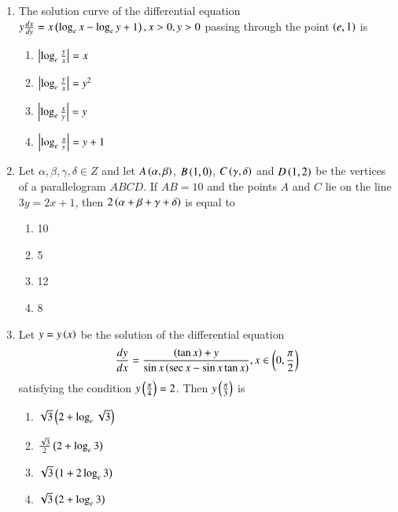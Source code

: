 \documentclass[journal]{IEEEtran}
\begin{document}
\begin{enumerate}
    \item The solution curve of the differential equation $y\frac{dx}{dy}
    = x\left(\log_e x - \log_e y + 1\right), x > 0, y > 0$ passing through the point
    $\left(e, 1\right)$ is

    \begin{multicols}{4}
\begin{enumerate}

        \item $\left\vert\log_e \frac{y}{x}\right\vert = x$
        \item $\left\vert\log_e \frac{y}{x}\right\vert = y^2$
        \item $\left\vert\log_e \frac{x}{y}\right\vert = y$
        \item $\left\vert\log_e \frac{x}{y}\right\vert = y + 1$
    \end{enumerate}
\end{multicols}

    \item Let $\alpha,\beta,\gamma,\delta \in Z$ and let $A\left(\alpha,\beta\right)$,
    $B\left(1, 0\right)$, $C\left(\gamma,\delta\right)$ and $D\left(1, 2\right)$ be the
    vertices of a parallelogram $ABCD$. If $AB = 10$ and the points
    $A$ and $C$ lie on the line $3y = 2x + 1$, then
    $2\left(\alpha + \beta + \gamma + \delta\right)$ is equal to

    \begin{multicols}{4}
\begin{enumerate}

        \item 10
        \item 5
        \item 12
        \item 8
    \end{enumerate}
\end{multicols}

    \item Let $y = y\left(x\right)$ be the solution of the differential equation
    \begin{align*}
    \frac{dy}{dx} = \frac{\left(\tan x\right) + y}{\sin x\left(\sec x - \sin x \tan x\right)},
    x \in \left(0, \frac{\pi}{2}\right)
    \end{align*}
    satisfying the condition $y\left(\frac{\pi}{4}\right) = 2$.
    Then $y\left(\frac{\pi}{3}\right)$ is

    \begin{multicols}{2}
\begin{enumerate}

        \item $\sqrt{3}\left(2 + \log_e \sqrt{3}\right)$
        \item $\frac{\sqrt{3}}{2}\left(2 + \log_e 3\right)$
        \item $\sqrt{3}\left(1 + 2 \log_e 3\right)$
        \item $\sqrt{3}\left(2 + \log_e 3\right)$
    \end{enumerate}
\end{multicols}


\end{enumerate}
\end{document}
